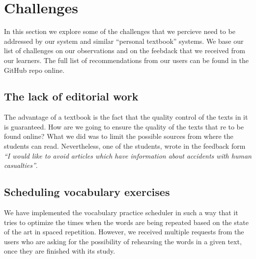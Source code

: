 \newpage
\section{Challenges}
\label{sec:challenges}

In this section we explore some of the challenges that we percieve need to be addressed by our system and similar ``personal textbook'' systems. We base our list of challenges on our observations and on the feebdack that we received from our learners. The full list of recommendations from our users can be found in the GitHub repo online.

\subsection{The lack of editorial work}
The advantage of a textbook is the fact that the quality control of the texts in it is guaranteed. How are we going to ensure the quality of the texts that re to be found online? What we did was to limit the possible sources from where the students can read. Nevertheless, one of the students, wrote in the feedback form {\em ``I would like to avoid articles which have information about accidents with human casualties''}.




\subsection{Scheduling vocabulary exercises}
We have implemented the vocabulary practice scheduler in such a way that it tries to optimize the times when the words are being repeated based on the state of the art in spaced repetition. However, we received multiple requests from the users who are asking for the possibility of rehearsing the words in a given text, once they are finished with its study. 


